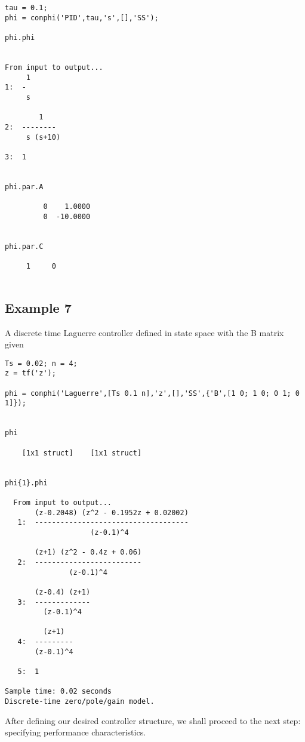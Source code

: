 \documentclass [12pt , a4paper] {report}
\begin{document}
\begin{lstlisting}
tau = 0.1;
phi = conphi('PID',tau,'s',[],'SS');

phi.phi

 
From input to output...
     1
1:  -
     s
 
        1
2:  --------
     s (s+10)
 
3:  1


phi.par.A

         0    1.0000
         0  -10.0000


phi.par.C

     1     0
         
\end{lstlisting}


\subsection{Example 7} A discrete time Laguerre controller defined in state space with the B matrix given

\begin{lstlisting}
Ts = 0.02; n = 4;
z = tf('z');

phi = conphi('Laguerre',[Ts 0.1 n],'z',[],'SS',{'B',[1 0; 1 0; 0 1; 0 1]});


phi

	[1x1 struct]    [1x1 struct]

    
phi{1}.phi
    
  From input to output...
       (z-0.2048) (z^2 - 0.1952z + 0.02002)
   1:  ------------------------------------
                    (z-0.1)^4
 
       (z+1) (z^2 - 0.4z + 0.06)
   2:  -------------------------
               (z-0.1)^4
 
       (z-0.4) (z+1)
   3:  -------------
         (z-0.1)^4
 
         (z+1)
   4:  ---------
       (z-0.1)^4
 
   5:  1
 
Sample time: 0.02 seconds
Discrete-time zero/pole/gain model.

\end{lstlisting}


After defining our desired controller structure, we shall proceed to the next step: specifying performance characteristics.
\end{document}
